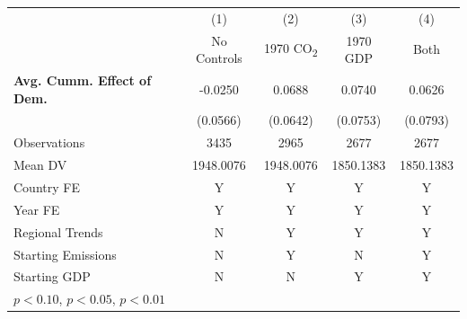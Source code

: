 \begin{tabular}{l*{4}{c}}
\hline
            &\multicolumn{1}{c}{(1)}&\multicolumn{1}{c}{(2)}&\multicolumn{1}{c}{(3)}&\multicolumn{1}{c}{(4)}\\
            &\multicolumn{1}{c}{No Controls}&\multicolumn{1}{c}{1970 CO\textsubscript{2}}&\multicolumn{1}{c}{1970 GDP}&\multicolumn{1}{c}{Both}\\
\hline
\textbf{Avg. Cumm. Effect of Dem.}&     -0.0250         &      0.0688         &      0.0740         &      0.0626         \\
            &    (0.0566)         &    (0.0642)         &    (0.0753)         &    (0.0793)         \\
\midrule
Observations&        3435         &        2965         &        2677         &        2677         \\
Mean DV     &   1948.0076         &   1948.0076         &   1850.1383         &   1850.1383         \\
Country FE  &           Y         &           Y         &           Y         &           Y         \\
Year FE     &           Y         &           Y         &           Y         &           Y         \\
Regional Trends&           N         &           Y         &           Y         &           Y         \\
Starting Emissions&           N         &           Y         &           N         &           Y         \\
Starting GDP&           N         &           N         &           Y         &           Y         \\
\hline
\multicolumn{5}{l}{\footnotesize \sym{*} \(p<0.10\), \sym{**} \(p<0.05\), \sym{***} \(p<0.01\)}\\
\end{tabular}
